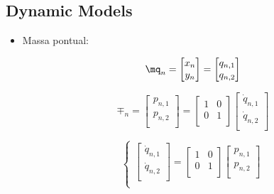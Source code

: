 \subsection{Dynamic Models}\label{S02-2}

\begin{itemize}

\item Massa pontual:

\begin{equation}
\mq_n = \begin{bmatrix}
x_n \\
y_n \\
\end{bmatrix}
=
\begin{bmatrix}
q_{n,1} \\
q_{n,2} \\
\end{bmatrix}
\end{equation}

\begin{equation}
\mp_n = \begin{bmatrix}
p_{n,1} \\
p_{n,2} \\
\end{bmatrix}
=
\begin{bmatrix}
1 & 0 \\
0 & 1 \\
\end{bmatrix}
\begin{bmatrix}
\dot{q}_{n,1} \\
\dot{q}_{n,2} \\
\end{bmatrix}
\end{equation}

\begin{equation}
\begin{cases}

\begin{bmatrix}
\dot{q}_{n,1} \\
\dot{q}_{n,2} \\
\end{bmatrix}
=
\begin{bmatrix}
1 & 0 \\
0 & 1 \\
\end{bmatrix}
\begin{bmatrix}
p_{n,1} \\
p_{n,2} \\
\end{bmatrix} \\


\end{cases}
\end{equation}
\end{itemize}
